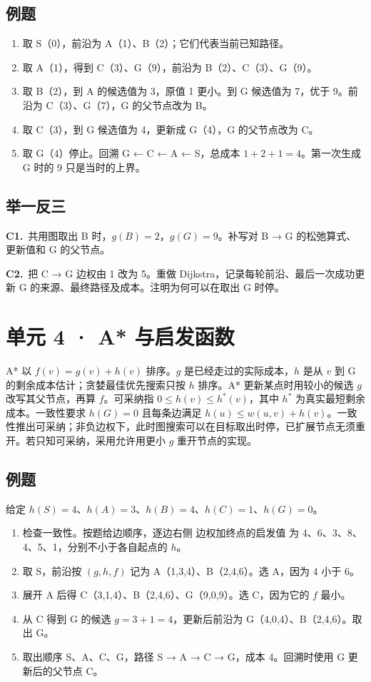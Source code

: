 \documentclass[UTF8,a4paper,11pt]{ctexart}
\newcommand{\PracticeQuestion}[3]{\par\Needspace{4\baselineskip}\noindent\begin{minipage}{\linewidth}\textbf{#1.}\ #2\par\noindent\rule{0pt}{#3mm}\par\end{minipage}\par}
\begin{document}
\subsection{例题}
\begin{enumerate}
\item 取 S（0），前沿为 A（1）、B（2）；它们代表当前已知路径。
\item 取 A（1），得到 C（3）、G（9），前沿为 B（2）、C（3）、G（9）。
\item 取 B（2），到 A 的候选值为 3，原值 1 更小。到 G 候选值为 7，优于 9。前沿为 C（3）、G（7），G 的父节点改为 B。
\item 取 C（3），到 G 候选值为 4，更新成 G（4），G 的父节点改为 C。
\item 取 G（4）停止。回溯 G ← C ← A ← S，总成本 $1+2+1=4$。第一次生成 G 时的 9 只是当时的上界。
\end{enumerate}
\subsection{举一反三}
\PracticeQuestion{C1}{共用图取出 B 时，$g(B)=2$，$g(G)=9$。补写对 B → G 的松弛算式、更新值和 G 的父节点。}{27}
\PracticeQuestion{C2}{把 C → G 边权由 1 改为 5。重做 Dijkstra，记录每轮前沿、最后一次成功更新 G 的来源、最终路径及成本。注明为何可以在取出 G 时停。}{35}
\clearpage
\section{单元 4 · A* 与启发函数}
A* 以 $f(v)=g(v)+h(v)$ 排序。$g$ 是已经走过的实际成本，$h$ 是从 $v$ 到 G 的剩余成本估计；贪婪最佳优先搜索只按 $h$ 排序。A* 更新某点时用较小的候选 $g$ 改写其父节点，再算 $f$。可采纳指 $0\le h(v)\le h^*(v)$，其中 $h^*$ 为真实最短剩余成本。一致性要求 $h(G)=0$ 且每条边满足 $h(u)\le w(u,v)+h(v)$。一致性推出可采纳；非负边权下，此时图搜索可以在目标取出时停，已扩展节点无须重开。若只知可采纳，采用允许用更小 $g$ 重开节点的实现。

\subsection{例题}
给定 $h(S)=4$、$h(A)=3$、$h(B)=4$、$h(C)=1$、$h(G)=0$。

\begin{enumerate}
\item 检查一致性。按题给边顺序，逐边右侧 边权加终点的启发值 为 4、6、3、8、4、5、1，分别不小于各自起点的 $h$。
\item 取 S，前沿按 $(g,h,f)$ 记为 A（1,3,4）、B（2,4,6）。选 A，因为 4 小于 6。
\item 展开 A 后得 C（3,1,4）、B（2,4,6）、G（9,0,9）。选 C，因为它的 $f$ 最小。
\item 从 C 得到 G 的候选 $g=3+1=4$，更新后前沿为 G（4,0,4）、B（2,4,6）。取出 G。
\item 取出顺序 S、A、C、G，路径 S → A → C → G，成本 4。回溯时使用 G 更新后的父节点 C。
\end{enumerate}
\end{document}
